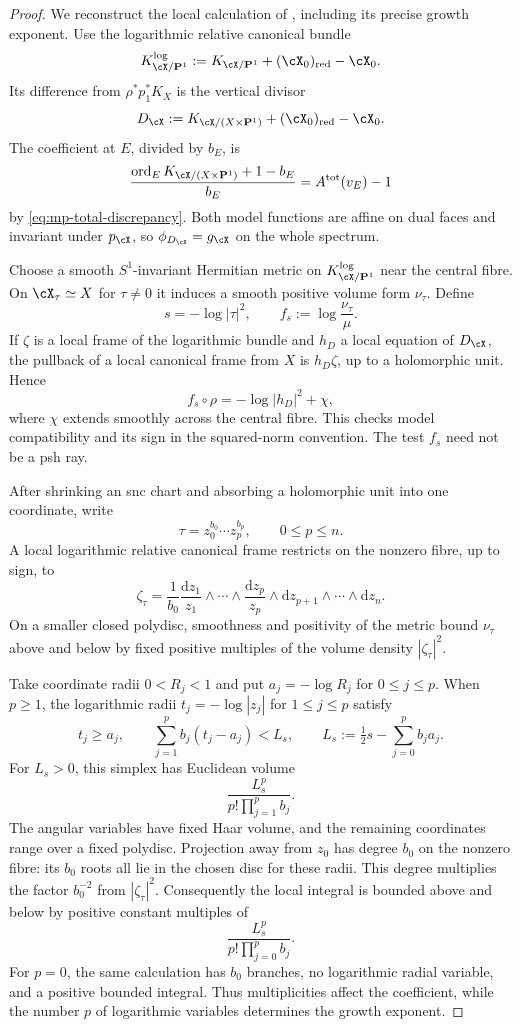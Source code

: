 \begin{proof}
We reconstruct the local calculation of \cite[Lemma~3.11, p.~2924]{BHJ19}, including its precise growth exponent. Use the logarithmic relative canonical bundle
\[
 K^{\log}_{\cX/\mathbf P^1}
 :=K_{\cX/\mathbf P^1}+(\cX_0)_{\mathrm{red}}-\cX_0.
\]
Its difference from $\rho^*p_1^*K_X$ is the vertical divisor
\[
 D_{\cX}:=K_{\cX/(X\times\mathbf P^1)}
           +(\cX_0)_{\mathrm{red}}-\cX_0.
\]
The coefficient at $E$, divided by $b_E$, is
\[
 \frac{\operatorname{ord}_E K_{\cX/(X\times\mathbf P^1)}+1-b_E}{b_E}
                 =A^{\mathrm{tot}}(v_E)-1
\]
by \eqref{eq:mp-total-discrepancy}. Both model functions are affine on dual faces and invariant under $p_{\cX}$, so $\phi_{D_{\cX}}=g_{\cX}$ on the whole spectrum.

Choose a smooth $S^1$-invariant Hermitian metric on $K^{\log}_{\cX/\mathbf P^1}$ near the central fibre. On $\cX_\tau\simeq X$ for $\tau\ne0$ it induces a smooth positive volume form $\nu_\tau$. Define
\[
                    s=-\log|\tau|^2,\qquad
                    f_s:=\log\frac{\nu_\tau}{\mu}.
\]
If $\zeta$ is a local frame of the logarithmic bundle and $h_D$ a local equation of $D_{\cX}$, the pullback of a local canonical frame from $X$ is $h_D\zeta$, up to a holomorphic unit. Hence
\[
                    f_s\circ\rho=-\log|h_D|^2+\chi,
\]
where $\chi$ extends smoothly across the central fibre. This checks model compatibility and its sign in the squared-norm convention. The test $f_s$ need not be a psh ray.

After shrinking an snc chart and absorbing a holomorphic unit into one coordinate, write
\[
            \tau=z_0^{b_0}\cdots z_p^{b_p},\qquad 0\leq p\leq n.
\]
A local logarithmic relative canonical frame restricts on the nonzero fibre, up to sign, to
\[
 \zeta_\tau=\frac1{b_0}
     \frac{\mathrm{d}z_1}{z_1}\wedge\cdots\wedge
     \frac{\mathrm{d}z_p}{z_p}\wedge
     \mathrm{d}z_{p+1}\wedge\cdots\wedge\mathrm{d}z_n.
\]
On a smaller closed polydisc, smoothness and positivity of the metric bound $\nu_\tau$ above and below by fixed positive multiples of the volume density $|\zeta_\tau|^2$.

Take coordinate radii $0<R_j<1$ and put $a_j=-\log R_j$ for $0\leq j\leq p$. When $p\geq1$, the logarithmic radii $t_j=-\log|z_j|$ for $1\leq j\leq p$ satisfy
\[
 t_j\geq a_j,\qquad
 \sum_{j=1}^p b_j(t_j-a_j)<L_s,
 \qquad L_s:=\tfrac12s-\sum_{j=0}^p b_ja_j.
\]
For $L_s>0$, this simplex has Euclidean volume
\[
                       \frac{L_s^p}{p!\prod_{j=1}^p b_j}.
\]
The angular variables have fixed Haar volume, and the remaining coordinates range over a fixed polydisc. Projection away from $z_0$ has degree $b_0$ on the nonzero fibre: its $b_0$ roots all lie in the chosen disc for these radii. This degree multiplies the factor $b_0^{-2}$ from $|\zeta_\tau|^2$. Consequently the local integral is bounded above and below by positive constant multiples of
\[
                       \frac{L_s^p}{p!\prod_{j=0}^p b_j}.
\]
For $p=0$, the same calculation has $b_0$ branches, no logarithmic radial variable, and a positive bounded integral. Thus multiplicities affect the coefficient, while the number $p$ of logarithmic variables determines the growth exponent.


\end{proof}
